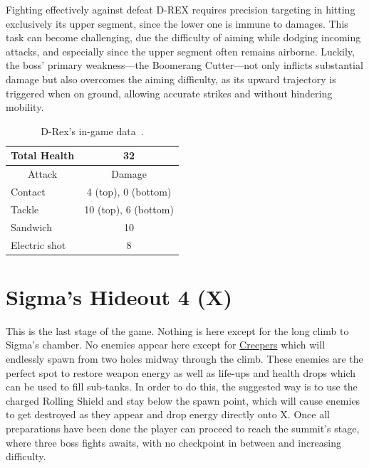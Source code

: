 Fighting effectively against defeat D-REX requires precision targeting in hitting exclusively its upper segment, since the lower one is immune to damages. This task can become challenging, due the difficulty of aiming while dodging incoming attacks, and especially since the upper segment often remains airborne. Luckily, the boss' primary weakness—the Boomerang Cutter—not only inflicts substantial damage but also overcomes the aiming difficulty, as its upward trajectory is triggered when on ground, allowing accurate strikes and without hindering mobility.


\begin{table}[h]
	\centering
	\begin{tabular}[htp]{l c}
		\toprule
		Total Health  & 32\\
		\midrule
		\multicolumn{1}{c}{Attack} & \multicolumn{1}{c}{Damage}\\
		Contact  & 4 (top), 0 (bottom)\\
		Tackle & 10 (top), 6 (bottom)\\
		Sandwich & 10\\
		Electric shot & 8\\
		\bottomrule
	\end{tabular}
	\caption{D-Rex's in-game data~\cite{wiki:D-REX,book:Compendium}.}
\end{table}

\section{Sigma's Hideout 4 (X)}
This is the last stage of the game. Nothing  is here except for the long climb to Sigma's chamber. No enemies appear here except for \hyperlink{enem:Creeper}{Creepers} which will endlessly spawn from two holes midway through the climb. These enemies are the perfect spot to restore weapon energy as well as life-ups and health drops which can be used to fill sub-tanks. In order to do this, the suggested way is to use the charged Rolling Shield and stay below the spawn point, which will cause enemies to get destroyed as they appear and drop energy directly onto X. Once all preparations have been done the player can proceed to reach the summit's stage, where three boss fights awaits, with no checkpoint in between and increasing difficulty.

